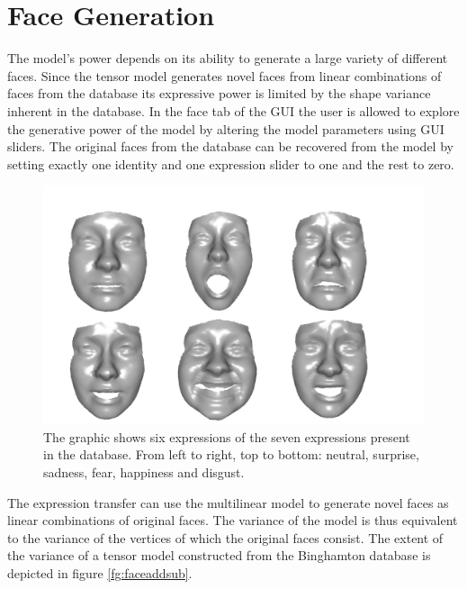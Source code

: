 \documentclass[11pt,a4paper]{report}
\begin{document}
\section{Face Generation}
The model's power depends on its ability to generate a large variety of
different faces. Since the tensor model generates novel faces from linear
combinations of faces from the database its expressive power is limited by the
shape variance inherent in the database. In the face tab of the GUI the user is
allowed to explore the generative power of the model by altering the model
parameters using GUI sliders. The original faces from the database can be
recovered from the model by setting exactly one identity and one expression
slider to one and the rest to zero. 
\begin{figure}[H]
\begin{centering}
\includegraphics[scale=0.25]{images/faces_generated.png}
\par\end{centering}

\caption{The graphic shows six expressions of the seven
  expressions present in the database. From left to
  right, top to bottom: neutral, surprise, sadness, fear, happiness and disgust.}
\label{fg:facegen}
\end{figure}

The expression transfer can use the multilinear model to generate novel faces as
linear combinations of original faces. The variance of the model is thus
equivalent to the variance of the vertices of which the original faces consist. The extent of the variance of a tensor model constructed from the Binghamton database is depicted in figure \ref{fg:faceaddsub}.
\end{document}
